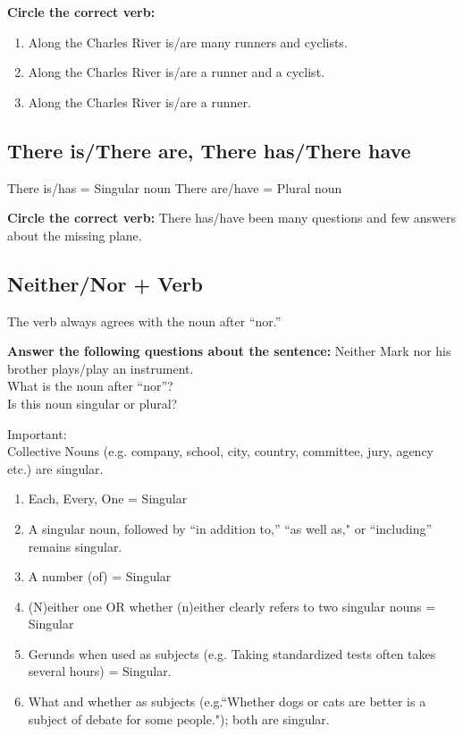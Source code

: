 \documentclass[12pt]{book}
\begin{document}
\bigskip
\textbf{Circle the correct verb:}
\begin{enumerate}\itemsep-0.4em
\item{Along the Charles River is/are many runners and cyclists.}
\item{Along the Charles River is/are a runner and a cyclist.}
\item{Along the Charles River is/are a runner.}
\end{enumerate}

\subsection{There is/There are, There has/There have}
There is/has = Singular noun
There are/have = Plural noun

\bigskip
\textbf{Circle the correct verb:} 
There has/have been many questions and few answers about the missing plane.

\subsection{Neither/Nor + Verb}
The verb always agrees with the noun after ``nor.''

\bigskip
\textbf{Answer the following questions about the sentence:}
Neither Mark nor his brother plays/play an instrument.\\
What is the noun after ``nor''? \hrulefill \\
Is this noun singular or plural? \hrulefill

\bigskip
Important:\\
Collective Nouns (e.g. company, school, city, country, committee, jury, agency etc.) are singular.

\begin{enumerate}
\item{Each, Every, One = Singular}
\item{A singular noun, followed by ``in addition to,'' ``as well as," or ``including''} remains singular.
\item{A number (of) = Singular}
\item{(N)either one OR whether (n)either clearly refers to two singular nouns = Singular}
\item{Gerunds when used as subjects (e.g. Taking standardized tests often takes several hours) = Singular.}
\item{What and whether as subjects (e.g.``Whether dogs or cats are better is a subject of debate for some people."); both are singular.}
\end{enumerate}
\end{document}
